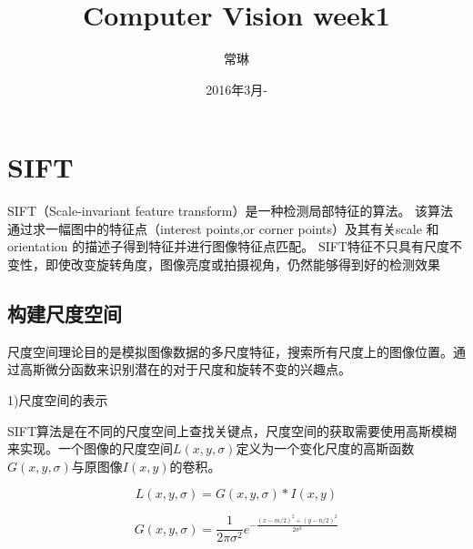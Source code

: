 \documentclass[12pt]{article}
\numberwithin{equation}{section}%
\begin{document}
\title{\vspace{-2em}Computer Vision week1\vspace{-0.7em}}
\author{常琳}
\date{\vspace{-0.7em}2016年3月-\vspace{-0.7em}}
\maketitle\thispagestyle{fancy}
\maketitle
\tableofcontents 
\section{SIFT}

SIFT（Scale-invariant feature transform）是一种检测局部特征的算法。 该算法通过求一幅图中的特征点（interest points,or corner points）及其有关scale 和 orientation 的描述子得到特征并进行图像特征点匹配。
SIFT特征不只具有尺度不变性，即使改变旋转角度，图像亮度或拍摄视角，仍然能够得到好的检测效果



\subsection{构建尺度空间}

尺度空间理论目的是模拟图像数据的多尺度特征，搜索所有尺度上的图像位置。通过高斯微分函数来识别潜在的对于尺度和旋转不变的兴趣点。

1)尺度空间的表示

SIFT算法是在不同的尺度空间上查找关键点，尺度空间的获取需要使用高斯模糊来实现。一个图像的尺度空间$L(x,y,\sigma)$定义为一个变化尺度的高斯函数$G(x,y,\sigma)$与原图像$I(x,y)$的卷积。

\begin{equation}
L(x,y,\sigma)=G(x,y,\sigma)*I(x,y)
\end{equation}

\begin{equation}
G(x,y,\sigma)=\frac{1}{2\pi \sigma^{2}}e^{-\frac{(x-m/2)^{2}+(y-n/2)^{2}}{2\sigma^{2}}}
\end{equation}
\end{document}
